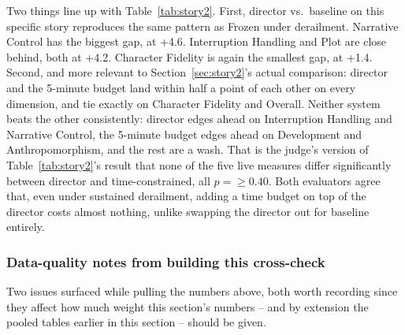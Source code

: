 \documentclass[10pt]{article}
\newcommand{\pval}[1]{$p = #1$}
\begin{document}
Two things line up with Table~\ref{tab:story2}. First, director vs.\ baseline on this specific story reproduces the same pattern as Frozen under derailment. Narrative Control has the biggest gap, at +4.6. Interruption Handling and Plot are close behind, both at +4.2. Character Fidelity is again the smallest gap, at +1.4. Second, and more relevant to Section~\ref{sec:story2}'s actual comparison: director and the 5-minute budget land within half a point of each other on every dimension, and tie exactly on Character Fidelity and Overall. Neither system beats the other consistently: director edges ahead on Interruption Handling and Narrative Control, the 5-minute budget edges ahead on Development and Anthropomorphism, and the rest are a wash. That is the judge's version of Table~\ref{tab:story2}'s result that none of the five live measures differ significantly between director and time-constrained, all \pval{\ge 0.40}. Both evaluators agree that, even under sustained derailment, adding a time budget on top of the director costs almost nothing, unlike swapping the director out for baseline entirely.

\subsubsection{Data-quality notes from building this cross-check}

Two issues surfaced while pulling the numbers above, both worth recording since they affect how much weight this section's numbers -- and by extension the pooled tables earlier in this section -- should be given.
\end{document}
